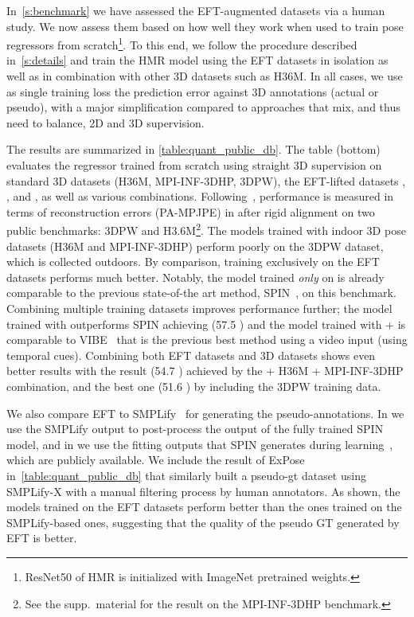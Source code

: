 \documentclass[10pt,twocolumn,letterpaper]{article}
\begin{document}
	In~\cref{s:benchmark} we have assessed the EFT-augmented datasets via a human study.
	We now assess them based on how well they work when used to train pose regressors from scratch\footnote{ResNet50 of HMR is initialized with ImageNet pretrained weights.}.
	To this end, we follow the procedure described in~\cref{s:details} and train the HMR model using the EFT datasets in isolation as well as in combination with other 3D datasets such as H36M.
	In all cases, we use as single training loss the prediction error against 3D annotations (actual or pseudo), with a major simplification compared to approaches that mix, and thus need to balance, 2D and 3D supervision.
	
	The results are summarized in \cref{table:quant_public_db}.
	The table (bottom) evaluates the regressor trained from scratch using straight 3D supervision on standard 3D datasets (H36M, MPI-INF-3DHP, 3DPW), the EFT-lifted datasets , ,  and , as well as various combinations.
	Following~\cite{kanazawa2018end, kolotouros2019spin}, performance is measured in terms of reconstruction errors (PA-MPJPE) in  after rigid alignment on two public benchmarks: 3DPW and H3.6M\footnote{See the supp.~material for the result on the MPI-INF-3DHP benchmark.}.
	The models trained with indoor 3D pose datasets (H36M and MPI-INF-3DHP) perform poorly on the 3DPW dataset, which is collected outdoors.
	By comparison, training exclusively on the EFT datasets performs much better.
	Notably, the model trained \emph{only} on   is already comparable to the previous state-of-the art method, SPIN~\cite{kolotouros19convolutional}, on this benchmark. Combining multiple training datasets improves performance further; the model trained with  outperforms SPIN achieving (57.5 ) and the model trained with  +  is comparable to VIBE~\cite{kocabas2019vibe} that is the previous best method using a video input (using temporal cues).
	Combining both EFT datasets and 3D datasets shows even better results with the result (54.7 ) achieved by the  + H36M + MPI-INF-3DHP combination, and the best one (51.6 ) by including the 3DPW training data.
	
	We also compare EFT to SMPLify~\cite{Bogo2016} for generating the pseudo-annotations.
	In  we use the SMPLify output to post-process the output of the fully trained SPIN model, and in  we use the fitting outputs that SPIN generates during learning~\cite{kolotouros2019spin}, which are publicly available.
	We include the result of ExPose~\cite{ExPose:2020} in~\cref{table:quant_public_db} that similarly built a pseudo-gt dataset using SMPLify-X with a manual filtering process by human annotators.
	As shown, the models trained on the EFT datasets perform better than the ones trained on the SMPLify-based ones, suggesting that the quality of the pseudo GT generated by EFT is better.
	
\end{document}

